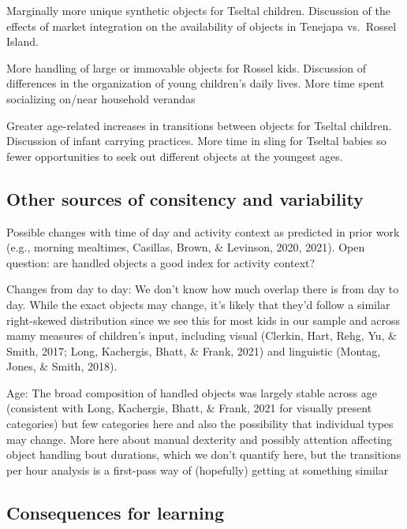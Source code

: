 \documentclass[10pt, letterpaper]{article}
\begin{document}
Marginally more unique synthetic objects for Tseltal children.
Discussion of the effects of market integration on the availability of
objects in Tenejapa vs.~Rossel Island.

More handling of large or immovable objects for Rossel kids. Discussion
of differences in the organization of young children's daily lives. More
time spent socializing on/near household verandas

Greater age-related increases in transitions between objects for Tseltal
children. Discussion of infant carrying practices. More time in sling
for Tseltal babies so fewer opportunities to seek out different objects
at the youngest ages.

\hypertarget{other-sources-of-consitency-and-variability}{%
\subsection{Other sources of consitency and
variability}\label{other-sources-of-consitency-and-variability}}

Possible changes with time of day and activity context as predicted in
prior work (e.g., morning mealtimes, Casillas, Brown, \& Levinson, 2020,
2021). Open question: are handled objects a good index for activity
context?

Changes from day to day: We don't know how much overlap there is from
day to day. While the exact objects may change, it's likely that they'd
follow a similar right-skewed distribution since we see this for most
kids in our sample and across mamy measures of children's input,
including visual (Clerkin, Hart, Rehg, Yu, \& Smith, 2017; Long,
Kachergis, Bhatt, \& Frank, 2021) and linguistic (Montag, Jones, \&
Smith, 2018).

Age: The broad composition of handled objects was largely stable across
age (consistent with Long, Kachergis, Bhatt, \& Frank, 2021 for visually
present categories) but few categories here and also the possibility
that individual types may change. More here about manual dexterity and
possibly attention affecting object handling bout durations, which we
don't quantify here, but the transitions per hour analysis is a
first-pass way of (hopefully) getting at something similar

\hypertarget{consequences-for-learning}{%
\subsection{Consequences for learning}\label{consequences-for-learning}}
\end{document}
